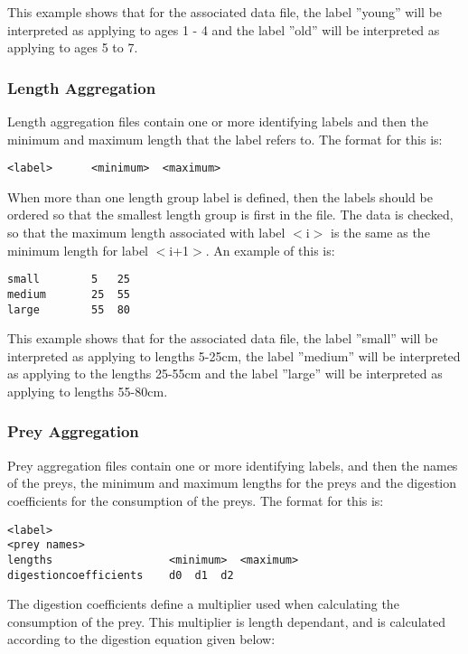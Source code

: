 \documentclass[10pt,twoside]{book}
\begin{document}
This example shows that for the associated data file, the label ''young'' will be interpreted as applying to ages 1 - 4 and the label ''old'' will be interpreted as applying to ages 5 to 7.

\subsubsection{Length Aggregation}\label{subsec:lenagg}
Length aggregation files contain one or more identifying labels and then the minimum and maximum length that the label refers to.  The format for this is:

{\small\begin{verbatim}
<label>      <minimum>  <maximum>
\end{verbatim}}

When more than one length group label is defined, then the labels should be ordered so that the smallest length group is first in the file.  The data is checked, so that the maximum length associated with label $<$i$>$ is the same as the minimum length for label $<$i+1$>$.  An example of this is:

{\small\begin{verbatim}
small        5   25
medium       25  55
large        55  80
\end{verbatim}}

This example shows that for the associated data file, the label ''small'' will be interpreted as applying to lengths 5-25cm, the label ''medium'' will be interpreted as applying to the lengths 25-55cm and the label ''large'' will be interpreted as applying to lengths 55-80cm.

\subsubsection{Prey Aggregation}\label{subsec:preyagg}
Prey aggregation files contain one or more identifying labels, and then the names of the preys, the minimum and maximum lengths for the preys and the digestion coefficients for the consumption of the preys.  The format for this is:

{\small\begin{verbatim}
<label>
<prey names>
lengths                  <minimum>  <maximum>
digestioncoefficients    d0  d1  d2
\end{verbatim}}

The digestion coefficients define a multiplier used when calculating the consumption of the prey.  This multiplier is length dependant, and is calculated according to the digestion equation given below:
\end{document}
